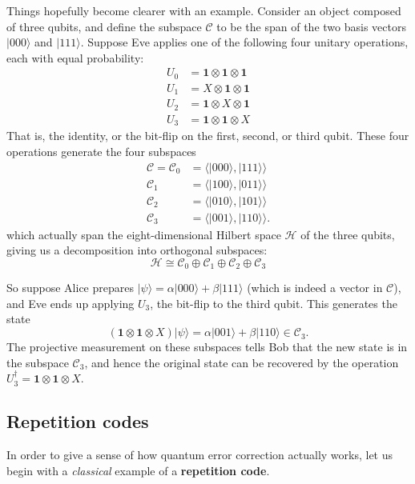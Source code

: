 \documentclass[fleqn,a4paper]{article}
\theoremstyle{definition}
\theoremstyle{definition}
\theoremstyle{definition}
\theoremstyle{definition}
\theoremstyle{remark}
\begin{document}
Things hopefully become clearer with an example.
Consider an object composed of three qubits, and define the subspace \(\mathcal{C}\) to be the span of the two basis vectors \(|000\rangle\) and \(|111\rangle\).
Suppose Eve applies one of the following four unitary operations, each with equal probability:
\[
  \begin{aligned}
    U_0 &= \mathbf{1}\otimes\mathbf{1}\otimes \mathbf{1}
  \\U_1 &= X\otimes\mathbf{1}\otimes \mathbf{1}
  \\U_2 &= \mathbf{1}\otimes X\otimes \mathbf{1}
  \\U_3 &= \mathbf{1}\otimes\mathbf{1}\otimes X
  \end{aligned}
\]
That is, the identity, or the bit-flip on the first, second, or third qubit.
These four operations generate the four subspaces
\[
  \begin{aligned}
    \mathcal{C} = \mathcal{C}_0 &= \Big\langle|000\rangle,|111\rangle\Big\rangle
  \\\mathcal{C}_1 &= \Big\langle|100\rangle,|011\rangle\Big\rangle
  \\\mathcal{C}_2 &= \Big\langle|010\rangle,|101\rangle\Big\rangle
  \\\mathcal{C}_3 &= \Big\langle|001\rangle,|110\rangle\Big\rangle.
  \end{aligned}
\]
which actually span the eight-dimensional Hilbert space \(\mathcal{H}\) of the three qubits, giving us a decomposition into orthogonal subspaces:
\[
  \mathcal{H}
  \cong \mathcal{C}_0 \oplus \mathcal{C}_1 \oplus\mathcal{C}_2 \oplus \mathcal{C}_3
\]

So suppose Alice prepares \(|\psi\rangle=\alpha|000\rangle+\beta|111\rangle\) (which is indeed a vector in \(\mathcal{C}\)), and Eve ends up applying \(U_3\), the bit-flip to the third qubit.
This generates the state
\[
  (\mathbf{1}\otimes\mathbf{1}\otimes X)|\psi\rangle
  = \alpha|001\rangle+\beta|110\rangle \in \mathcal{C}_3.
\]
The projective measurement on these subspaces tells Bob that the new state is in the subspace \(\mathcal{C}_3\), and hence the original state can be recovered by the operation \(U_3^\dagger=\mathbf{1}\otimes\mathbf{1}\otimes X\).

\hypertarget{repetition-codes}{%
\subsection{Repetition codes}\label{repetition-codes}}

In order to give a sense of how quantum error correction actually works, let us begin with a \emph{classical} example of a \textbf{repetition code}.
\end{document}

